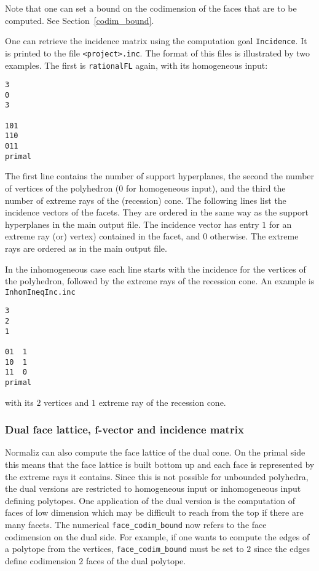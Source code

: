 Note that one can set a bound on the codimension of the faces that are to be computed. See Section~\ref{codim_bound}.

One can retrieve the incidence matrix using the computation goal \verb|Incidence|. It is printed to the file \verb|<project>.inc|. The format of this files is illustrated by two examples. The first is \verb|rationalFL| again, with its homogeneous input:
\begin{Verbatim}
3
0
3

101
110
011
primal
\end{Verbatim}
The first line contains the number of support hyperplanes, the second the number of vertices of the polyhedron ($0$ for homogeneous input), and the third the number of extreme rays of the (recession) cone. The following lines list the incidence vectors of the facets. They are ordered in the same way as the support hyperplanes in the main output file. The incidence vector has entry $1$ for an extreme ray (or) vertex) contained in the facet, and $0$ otherwise. The extreme rays are ordered as in the main output file.

In the inhomogeneous case each line starts with the incidence for the vertices of the polyhedron, followed by the extreme rays of the recession cone. An example is \verb|InhomIneqInc.inc|
\begin{Verbatim}
3
2
1

01  1
10  1
11  0
primal
\end{Verbatim}
with its $2$ vertices and $1$ extreme ray of the recession cone.

\subsubsection{Dual face lattice, f-vector and incidence matrix}

Normaliz can also compute the face lattice of the dual cone. On the primal side this means that the face lattice is built bottom up and each face is represented by the extreme rays it contains. Since this is not possible for unbounded polyhedra, the dual versions are restricted to homogeneous input or inhomogeneous input defining polytopes. One application of the dual version is the computation of faces of low dimension which may be difficult to reach from the top if there are many facets. The numerical \verb|face_codim_bound| now refers to the face codimension on the dual side. For example, if one wants to compute the edges of a polytope from the vertices, \verb|face_codim_bound| must be set to $2$ since the edges define codimension $2$ faces of the dual polytope.

